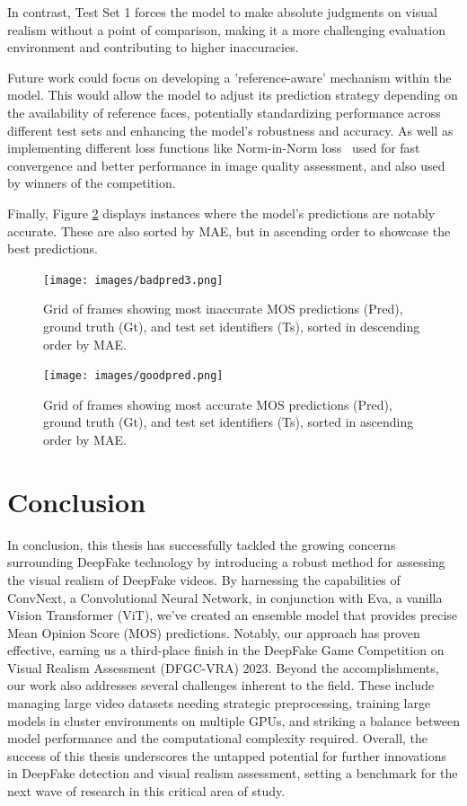 \documentclass[a4paper,12pt,openright]{book}
\begin{document}
In contrast, Test Set 1 forces the model to make absolute judgments on visual realism without a point of comparison, making it a more challenging evaluation environment and contributing to higher inaccuracies.

Future work could focus on developing a 'reference-aware' mechanism within the model. This would allow the model to adjust its prediction strategy depending on the availability of reference faces, potentially standardizing performance across different test sets and enhancing the model's robustness and accuracy. As well as implementing different loss functions like Norm-in-Norm loss~\cite{norminnorm} used for fast convergence and better performance in image quality assessment, and also used by winners of the competition.

Finally, Figure \ref{fig:goodpred} displays instances where the model's predictions are notably accurate. These are also sorted by MAE, but in ascending order to showcase the best predictions.

\begin{figure}[!htb]
\centering
\texttt{[image: images/badpred3.png]}
\caption{Grid of frames showing most inaccurate MOS predictions (Pred), ground truth (Gt), and test set identifiers (Ts), sorted in descending order by MAE.}
\label{fig:badpred}
\end{figure}

\begin{figure}[!htb]
\centering
\texttt{[image: images/goodpred.png]}
\caption{Grid of frames showing most accurate MOS predictions (Pred), ground truth (Gt), and test set identifiers (Ts), sorted in ascending order by MAE.}
\label{fig:goodpred}
\end{figure}
\chapter{Conclusion}
 In conclusion, this thesis has successfully tackled the growing concerns surrounding DeepFake technology by introducing a robust method for assessing the visual realism of DeepFake videos.
 By harnessing the capabilities of ConvNext, a Convolutional Neural Network, in conjunction with Eva, a vanilla Vision Transformer (ViT), we've created an ensemble model that provides precise Mean Opinion Score (MOS) predictions. Notably, our approach has proven effective, earning us a third-place finish in the DeepFake Game Competition on Visual Realism Assessment (DFGC-VRA) 2023.
Beyond the accomplishments, our work also addresses several challenges inherent to the field. These include managing large video datasets needing strategic preprocessing, training large models in cluster environments on multiple GPUs, and striking a balance between model performance and the computational complexity required.
Overall, the success of this thesis underscores the untapped potential for further innovations in DeepFake detection and visual realism assessment, setting a benchmark for the next wave of research in this critical area of study.
\end{document}
